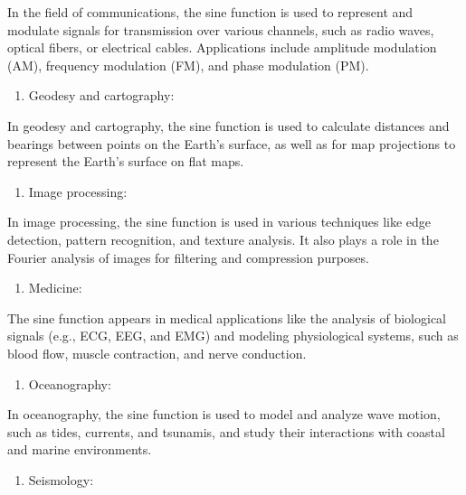 \documentclass[
]{article}
\providecommand{\tightlist}{%
  \setlength{\itemsep}{0pt}\setlength{\parskip}{0pt}}
\begin{document}
In the field of communications, the sine function is used to represent
and modulate signals for transmission over various channels, such as
radio waves, optical fibers, or electrical cables. Applications include
amplitude modulation (AM), frequency modulation (FM), and phase
modulation (PM).

\begin{enumerate}
\def\labelenumi{\arabic{enumi}.}
\setcounter{enumi}{2}
\tightlist
\item
  Geodesy and cartography:
\end{enumerate}

In geodesy and cartography, the sine function is used to calculate
distances and bearings between points on the Earth's surface, as well as
for map projections to represent the Earth's surface on flat maps.

\begin{enumerate}
\def\labelenumi{\arabic{enumi}.}
\setcounter{enumi}{3}
\tightlist
\item
  Image processing:
\end{enumerate}

In image processing, the sine function is used in various techniques
like edge detection, pattern recognition, and texture analysis. It also
plays a role in the Fourier analysis of images for filtering and
compression purposes.

\begin{enumerate}
\def\labelenumi{\arabic{enumi}.}
\setcounter{enumi}{4}
\tightlist
\item
  Medicine:
\end{enumerate}

The sine function appears in medical applications like the analysis of
biological signals (e.g., ECG, EEG, and EMG) and modeling physiological
systems, such as blood flow, muscle contraction, and nerve conduction.

\begin{enumerate}
\def\labelenumi{\arabic{enumi}.}
\setcounter{enumi}{5}
\tightlist
\item
  Oceanography:
\end{enumerate}

In oceanography, the sine function is used to model and analyze wave
motion, such as tides, currents, and tsunamis, and study their
interactions with coastal and marine environments.

\begin{enumerate}
\def\labelenumi{\arabic{enumi}.}
\setcounter{enumi}{6}
\tightlist
\item
  Seismology:
\end{enumerate}
\end{document}
